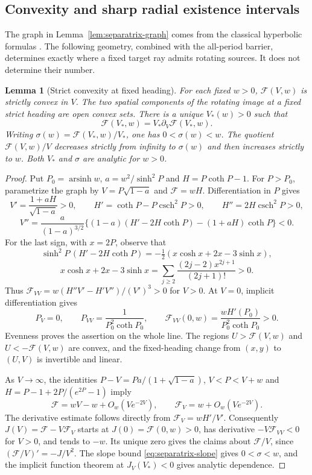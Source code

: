 \documentclass[11pt,a4paper]{article}
\newtheorem{lemma}[theorem]{Lemma}
\theoremstyle{remark}\newtheorem{remark}[theorem]{Remark}
\begin{document}
\subsection{Convexity and sharp radial existence intervals}
\label{sec:radial-existence}

The graph in Lemma~\ref{lem:separatrix-graph} comes from the classical
hyperbolic formulas \cite[Section 3.3]{MS}. The following geometry,
combined with the all-period barrier, determines exactly where a fixed
target ray admits rotating sources. It does not determine their number.

\begin{lemma}[Strict convexity at fixed heading]\label{lem:image-convexity}
For each fixed $w>0$, $\mathcal F(V,w)$ is strictly convex in $V$.
The two spatial components of the rotating image at a fixed strict
heading are open convex sets. There is a unique $V_*(w)>0$ such that
\[
 \mathcal F(V_*,w)=V_*\partial_V\mathcal F(V_*,w).
\]
Writing $\sigma(w)=\mathcal F(V_*,w)/V_*$, one has
$0<\sigma(w)<w$. The quotient $\mathcal F(V,w)/V$ decreases strictly
from infinity to $\sigma(w)$ and then increases strictly to $w$.
Both $V_*$ and $\sigma$ are analytic for $w>0$.
\end{lemma}
\begin{proof}
Put $P_0=\operatorname{arsinh}w$, $a=w^2/\sinh^2P$ and
$H=P\coth P-1$. For $P>P_0$, parametrize the graph by
$V=P\sqrt{1-a}$ and $\mathcal F=wH$. Differentiation in $P$ gives
\[
 V'=\frac{1+aH}{\sqrt{1-a}}>0,\qquad
 H'=\coth P-P\operatorname{csch}^2P>0,\qquad
 H''=2H\operatorname{csch}^2P>0,
\]
\[
 V''=\frac{a}{(1-a)^{3/2}}
 \bigl\{(1-a)(H'-2H\coth P)-(1+aH)\coth P\bigr\}<0.
\]
For the last sign, with $x=2P$, observe that
\[
 \sinh^2P\,(H'-2H\coth P)
 =-\tfrac12(x\cosh x+2x-3\sinh x),
\]
\[
 x\cosh x+2x-3\sinh x
 =\sum_{j\ge2}\frac{(2j-2)x^{2j+1}}{(2j+1)!}>0.
\]
Thus $\mathcal F_{VV}=w(H''V'-H'V'')/(V')^3>0$ for $V>0$.
At $V=0$, implicit differentiation gives
\[
 P_V=0,\qquad P_{VV}=\frac{1}{P_0^2\coth P_0},\qquad
 \mathcal F_{VV}(0,w)=\frac{wH'(P_0)}{P_0^2\coth P_0}>0.
\]
Evenness proves the assertion on the whole line. The regions
$U>\mathcal F(V,w)$ and $U<-\mathcal F(V,w)$ are convex, and
the fixed-heading change from $(x,y)$ to $(U,V)$ is invertible and linear.

As $V\to\infty$, the identities
$P-V=Pa/(1+\sqrt{1-a})$, $V<P<V+w$ and
$H=P-1+2P/(e^{2P}-1)$ imply
\begin{equation}\label{eq:image-asymptote}
 \mathcal F=wV-w+O_w(Ve^{-2V}),\qquad
 \mathcal F_V=w+O_w(Ve^{-2V}).
\end{equation}
The derivative estimate follows directly from $\mathcal F_V=wH'/V'$.
Consequently $J(V)=\mathcal F-V\mathcal F_V$ starts at
$J(0)=\mathcal F(0,w)>0$, has derivative $-V\mathcal F_{VV}<0$
for $V>0$, and tends to $-w$. Its unique zero gives the claims about
$\mathcal F/V$, since $(\mathcal F/V)'=-J/V^2$. The slope bound
\eqref{eq:separatrix-slope} gives $0<\sigma<w$, and the implicit
function theorem at $J_V(V_*)<0$ gives analytic dependence.
\end{proof}
\end{document}
